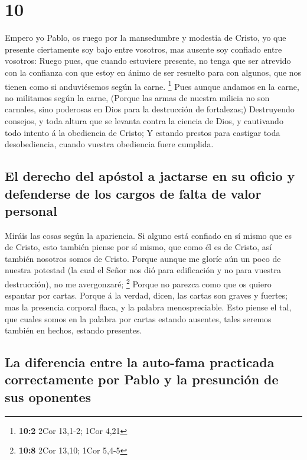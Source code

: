 \hypertarget{section-9}{%
\section{10}\label{section-9}}

 Empero yo Pablo, os ruego por la mansedumbre y modestia
de Cristo, yo que presente ciertamente soy bajo entre vosotros, mas
ausente soy confiado entre vosotros:  Ruego pues, que
cuando estuviere presente, no tenga que ser atrevido con la confianza
con que estoy en ánimo de ser resuelto para con algunos, que nos tienen
como si anduviésemos según la carne. \footnote{\textbf{10:2} 2Cor
  13,1-2; 1Cor 4,21}  Pues aunque andamos en la carne, no
militamos según la carne,  (Porque las armas de nuestra
milicia no son carnales, sino poderosas en Dios para la destrucción de
fortalezas;)  Destruyendo consejos, y toda altura que se
levanta contra la ciencia de Dios, y cautivando todo intento á la
obediencia de Cristo;  Y estando prestos para castigar
toda desobediencia, cuando vuestra obediencia fuere cumplida.

\hypertarget{el-derecho-del-apuxf3stol-a-jactarse-en-su-oficio-y-defenderse-de-los-cargos-de-falta-de-valor-personal}{%
\subsection{El derecho del apóstol a jactarse en su oficio y defenderse
de los cargos de falta de valor
personal}\label{el-derecho-del-apuxf3stol-a-jactarse-en-su-oficio-y-defenderse-de-los-cargos-de-falta-de-valor-personal}}

 Miráis las cosas según la apariencia. Si alguno está
confiado en sí mismo que es de Cristo, esto también piense por sí mismo,
que como él es de Cristo, así también nosotros somos de Cristo.
 Porque aunque me gloríe aún un poco de nuestra potestad
(la cual el Señor nos dió para edificación y no para vuestra
destrucción), no me avergonzaré; \footnote{\textbf{10:8} 2Cor 13,10;
  1Cor 5,4-5}  Porque no parezca como que os quiero
espantar por cartas.  Porque á la verdad, dicen, las
cartas son graves y fuertes; mas la presencia corporal flaca, y la
palabra menospreciable.  Esto piense el tal, que cuales
somos en la palabra por cartas estando ausentes, tales seremos también
en hechos, estando presentes.

\hypertarget{la-diferencia-entre-la-auto-fama-practicada-correctamente-por-pablo-y-la-presunciuxf3n-de-sus-oponentes}{%
\subsection{La diferencia entre la auto-fama practicada correctamente
por Pablo y la presunción de sus
oponentes}\label{la-diferencia-entre-la-auto-fama-practicada-correctamente-por-pablo-y-la-presunciuxf3n-de-sus-oponentes}}

